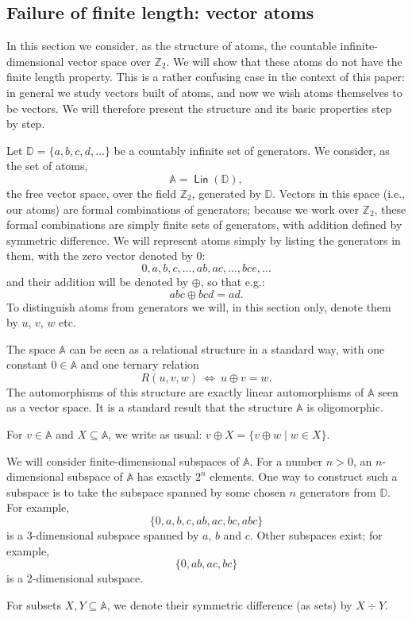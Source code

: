 \documentclass{theoretics}
\renewcommand{\iff}{\Leftrightarrow}
\newcommand{\Z}{{\mathbb Z}}
\newcommand{\D}{{\mathbb D}}
\newcommand{\xor}{\div}
\newcommand{\atoms}{\mathbb A}
\DeclareMathOperator{\lin}{\mathsf{Lin}}
\begin{document}
\subsection{Failure of finite length: vector atoms}\label{sec:vectoratoms}

In this section we consider, as the structure of atoms, the countable infinite-dimensional vector space over $\Z_2$. We will show that these atoms do not have the finite length property. This is a rather confusing case in the context of this paper: in general we study vectors built of atoms, and now we wish atoms themselves to be vectors. We will therefore present the structure and its basic properties step by step.

Let $\D = \{a,b,c,d,\ldots\}$ be a countably infinite set of generators. We consider, as the set of atoms, 
\[
	\atoms = \lin(\D),
\]
the free vector space, over the field $\Z_2$, generated by $\D$. Vectors in this space (i.e., our atoms) are formal combinations of generators; because we work over $\Z_2$, these formal combinations are simply finite sets of generators, with addition defined by symmetric difference. We will represent atoms simply by listing the generators in them, with the zero vector denoted by $0$:
\[
	0, a, b, c, \ldots, ab, ac, \ldots, bce, \ldots
\]
and their addition will be denoted by $\oplus$, so that e.g.:
\[
	abc \oplus bcd = ad.
\]
To distinguish atoms from generators we will, in this section only, denote them by $u$, $v$, $w$ etc. 

The space $\atoms$ can be seen as a relational structure in a standard way, with one constant $0\in\atoms$ and one ternary relation
\[
	R(u,v,w)\ \iff\ u\oplus v=w.
\]
The automorphisms of this structure are exactly linear automorphisms of $\atoms$ seen as a vector space. It is a standard result that the structure $\atoms$ is oligomorphic.

For $v\in \atoms$ and $X\subseteq \atoms$, we write as usual: $v\oplus X = \{v\oplus w \mid w\in X\}$.

We will consider finite-dimensional subspaces of $\atoms$. For a number $n>0$, an $n$-dimensional subspace of $\atoms$ has exactly $2^n$ elements. One way to construct such a subspace is to take the subspace spanned by some chosen $n$ generators from $\D$. For example,
\[
\{0,a,b,c,ab,ac,bc,abc\}
\]
is a 3-dimensional subspace spanned by $a$, $b$ and $c$. Other subspaces exist; for example,
\[
\{0,ab,ac,bc\}
\]
is a 2-dimensional subspace.

For subsets $X,Y\subseteq\atoms$, we denote their symmetric difference (as sets) by $X\xor Y$. 
\end{document}
